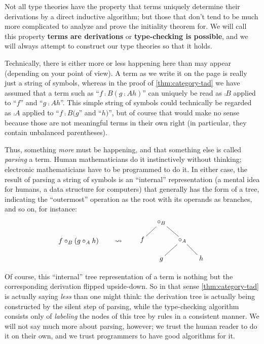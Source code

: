 Not all type theories have the property that terms uniquely determine their derivations by a direct inductive algorithm; but those that don't tend to be much more complicated to analyze and prove the initiality theorem for.
We will call this property \textbf{terms are derivations} or \textbf{type-checking is possible}, and we will always attempt to construct our type theories so that it holds.

\begin{rmk}
  Technically, there is either more or less happening here than may appear (depending on your point of view).
  A term as we write it on the page is really just a string of symbols, whereas in the proof of \cref{thm:category-tad} we have assumed that a term such as ``$f\comp{B} (g\comp{A} h)$'' can uniquely be read as $\comp{B}$ applied to ``$f$'' and ``$g\comp{A} h$''.
  This simple string of symbols could technically be regarded as $\comp{A}$ applied to ``$f\comp{B} (g$'' and ``$h)$'', but of course that would make no sense because those are not meaningful terms in their own right (in particular, they contain unbalanced parentheses).

  Thus, something \emph{more} must be happening, and that something else is called \emph{parsing} a term.
  Human mathematicians do it instinctively without thinking; electronic mathematicians have to be programmed to do it.
  In either case, the result of parsing a string of symbols is an ``internal'' representation (a mental idea for humans, a data structure for computers) that generally has the form of a tree, indicating the ``outermost'' operation as the root with its operands as branches, and so on, for instance:
  \[ f\comp{B} (g\comp{A} h) \qquad\leadsto\qquad \vcenter{\xymatrix@-1pc{ & \comp{B} \ar@{-}[dl] \ar@{-}[dr]\\
      f && \comp{A} \ar@{-}[dl]\ar@{-}[dr]\\
      & g && h }} \]

  Of course, this ``internal'' tree representation of a term is nothing but the corresponding derivation flipped upside-down.
  So in that sense \cref{thm:category-tad} is actually saying \emph{less} than one might think: the derivation tree is actually being constructed by the silent step of parsing, while the type-checking algorithm consists only of \emph{labeling} the nodes of this tree by rules in a consistent manner.
  We will not say much more about parsing, however;
  we trust the human reader to do it on their own, and we trust programmers to have good algorithms for it.
\end{rmk}

